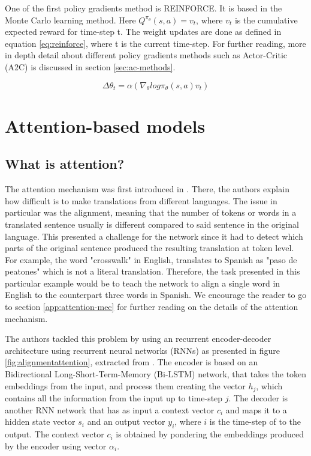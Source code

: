 One of the first policy gradients method is REINFORCE. It is based in the Monte Carlo learning method. Here ${Q}^{\pi_{\theta}}(s,a) = v_t$, where $v_t$ is the cumulative expected reward for time-step t. The weight updates are done as defined in equation \ref{eq:reinforce}, where t is the current time-step. For further reading, more in depth detail about different policy gradients methods such as Actor-Critic (A2C) is discussed in section \ref{sec:ac-methods}.

\begin{equation}\label{eq:reinforce}
	\Delta\theta_{t} = \alpha(\nabla_{\theta} log \pi_{\theta}(s,a)v_t)
\end{equation}

\section{Attention-based models}
\label{sec:attention}

\subsection{What is attention?}
\label{sec:whats-attention}
The attention mechanism was first introduced in \cite{bahdanau2016neural}. There, the authors explain how difficult is to make translations from different languages. The issue in particular was the alignment, meaning that the number of tokens or words in a translated sentence usually is different compared to said sentence in the original language. This presented a challenge for the network since it had to detect which parts of the original sentence produced the resulting translation at token level. For example, the word "crosswalk" in English, translates to Spanish as "paso de peatones" which is not a literal translation. Therefore, the task presented in this particular example would be to teach the network to align a single word in English to the counterpart three words in Spanish. We encourage the reader to go to section \ref{app:attention-mec} for further reading on the details of the attention mechanism.

The authors tackled this problem by using an recurrent encoder-decoder architecture using recurrent neural networks (RNNs) as presented in figure \ref{fig:alignmentattention}, extracted from \cite{understandingattentionmechanism}. The encoder is based on an Bidirectional Long-Short-Term-Memory (Bi-LSTM) network, that takes the token embeddings from the input, and process them creating the vector $h_j$, which contains all the information from the input up to time-step $j$. The decoder is another RNN network that has as input a context vector $c_i$ and maps it to a hidden state vector $s_i$ and an output vector $y_i$, where $i$ is the time-step of to the output. The context vector $c_i$ is obtained by pondering the embeddings produced by the encoder using vector $\alpha_i$. 

